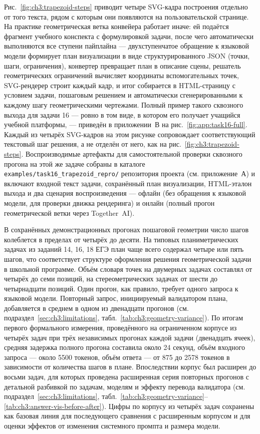 Рис.~\ref{fig:ch3:trapezoid-steps} приводит четыре SVG\nobreakdash-кадра построения отдельно от того текста, рядом с которым они появляются на пользовательской странице. На практике геометрическая ветка конвейера работает иначе: ей подаётся фрагмент учебного конспекта с формулировкой задачи, после чего автоматически выполняются все ступени пайплайна --- двухступенчатое обращение к языковой модели формирует план визуализации в виде структурированного JSON (точки, шаги, ограничения), конвертер превращает план в описание сцены, решатель геометрических ограничений вычисляет координаты вспомогательных точек, SVG\nobreakdash-рендерер строит каждый кадр, и итог собирается в HTML\nobreakdash-страницу с условием задачи, пошаговым решением и автоматически сгенерированными к каждому шагу геометрическими чертежами. Полный пример такого сквозного выхода для задачи 16 --- ровно в том виде, в котором его получает учащийся учебной платформы, --- приведён в приложении~В на рис.~\ref{fig:app:task16-full}. Каждый из четырёх SVG\nobreakdash-кадров на этом рисунке сопровождает соответствующий текстовый шаг решения, а не отделён от него, как на рис.~\ref{fig:ch3:trapezoid-steps}. Воспроизводимые артефакты для самостоятельной проверки сквозного прогона на этой же задаче собраны в каталоге \texttt{examples/task16\_trapezoid\_repro/} репозитория проекта (см. приложение~А) и включают входной текст задачи, сохранённый план визуализации, HTML\nobreakdash-эталон выхода и два сценария воспроизведения --- офлайн (без обращения к языковой модели, для проверки движка рендеринга) и онлайн (полный прогон геометрической ветки через Together~AI).

В сохранённых демонстрационных прогонах пошаговой геометрии число шагов колеблется в пределах от четырёх до десяти. На типовых планиметрических задачах из заданий 14, 16, 18 ЕГЭ план чаще всего содержал четыре или пять шагов, что соответствует структуре оформления решения геометрической задачи в школьной программе. Объём словаря точек на двумерных задачах составлял от четырёх до семи позиций, на стереометрических задачах от шести до четырнадцати позиций. Один прогон, как правило, требует одного запроса к языковой модели. Повторный запрос, инициируемый валидатором плана, добавляется в среднем в одном из двенадцати прогонов (см. подраздел~\ref{sec:ch3:limitations}, табл.~\ref{tab:ch3:geometry-variance}). По итогам первого формального измерения, проведённого на ограниченном корпусе из четырёх задач при трёх независимых прогонах каждой задачи (двенадцать ячеек), средняя задержка полного прогона составила около 24 секунд, объём входного запроса --- около 5500 токенов, объём ответа --- от 875 до 2578 токенов в зависимости от количества шагов в плане. Впоследствии корпус был расширен до восьми задач, для которых проведена расширенная серия повторных прогонов с детальной разбивкой по задачам, моделям и эффекту перевода валидатора (см. подраздел~\ref{sec:ch3:limitations}, табл.~\ref{tab:ch3:geometry-variance}--\ref{tab:ch3:answer-vis-before-after}). Цифры по корпусу из четырёх задач сохранены как базовая линия для последующего сравнения с расширенным корпусом и для оценки эффектов от изменения системного промпта и размера модели.

